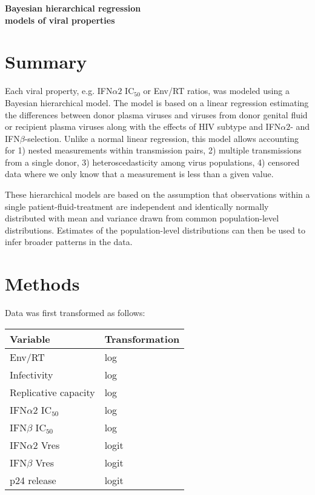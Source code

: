 \documentclass[12pt]{article}
\newcommand{\ifna}{IFN${\alpha 2}$}
\newcommand{\ifnb}{IFN${\beta}$}
\newcommand{\icFifty}{IC$_{50}$}
\begin{document}
\begin{center}
 \Large\textbf{Bayesian hierarchical regression\\ models of viral properties}
\end{center}
\section*{Summary}
Each viral property, e.g. \ifna{} \icFifty{} or Env/RT ratios, was modeled using a Bayesian hierarchical model.
  The model is based on a linear regression estimating the differences between
  donor plasma viruses and viruses from donor genital fluid or recipient plasma viruses along with the effects of HIV subtype and \ifna{}- and \ifnb{}-selection.
  Unlike a normal linear regression, this model allows accounting for
  1) nested measurements within transmission pairs,
  2) multiple transmissions from a single donor,
  3) heteroscedasticity among virus populations, 
  4) censored data where we only know that a measurement is less than a given value.

These hierarchical models are based on the assumption that observations within a single patient-fluid-treatment
  are independent and identically normally distributed with mean and variance drawn from common population-level distributions.
  Estimates of the population-level distributions can then be used to infer broader patterns in the data.

\section*{Methods}

Data was first transformed as follows:

\begin{table}[ht]
\centering
\begin{tabular}{|l|l|}
      \hline
      Variable             & Transformation \\ 
      \hline
      Env/RT               & log            \\ 
      Infectivity          & log            \\ 
      Replicative capacity & log            \\ 
      \ifna{} \icFifty{}   & log            \\ 
      \ifnb{} \icFifty{}   & log            \\ 
      \ifna{} Vres         & logit          \\ 
      \ifnb{} Vres         & logit          \\ 
      p24 release          & logit          \\ 
      \hline
\end{tabular}
\end{table}
\end{document}
